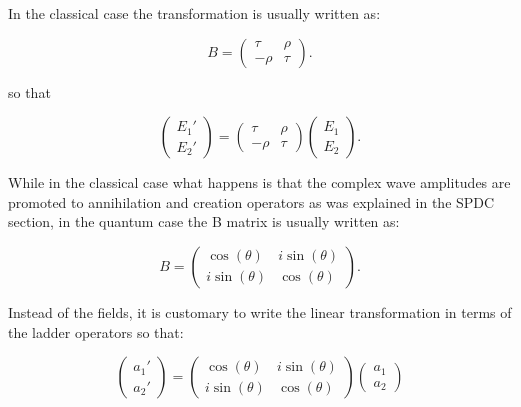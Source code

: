 \documentclass[12pt]{book}
\begin{document}
 In the classical case the transformation is usually written as:
 
 \begin{equation}
 B=\begin{pmatrix} \tau & \rho \\ -\rho & \tau \end{pmatrix}.
 \end{equation} 


so that 

\begin{equation}
\begin{pmatrix} E_{1}' \\ E_{2}' \end{pmatrix}=\begin{pmatrix} \tau & \rho \\ -\rho & \tau \end{pmatrix} \begin{pmatrix} E_{1} \\ E_{2} \end{pmatrix}.
\end{equation}

While in the classical case what happens is that the complex wave amplitudes are promoted to annihilation and creation operators as was explained in the SPDC section, in the quantum case the B matrix is usually written as:

\begin{equation} 
B=\begin{pmatrix} \cos(\theta) & i \sin(\theta) \\ i \sin(\theta) & \cos(\theta) \end{pmatrix}.
\end{equation}

Instead of the fields, it is customary to write the linear transformation in terms of the ladder operators so that:

\begin{equation}
\begin{pmatrix} a_{1}' \\ a_{2}' \end{pmatrix}=\begin{pmatrix} \cos(\theta) & i \sin(\theta) \\ i \sin(\theta) & \cos(\theta) \end{pmatrix} \begin{pmatrix} a_{1} \\ a_{2} \end{pmatrix}
\end{equation}
\end{document}

